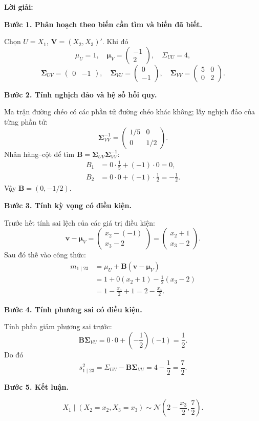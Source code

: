 \documentclass[11pt,a4paper]{article}
\renewcommand{\boldsymbol}[1]{\symbf{#1}}
\newenvironment{solution}{%
  \par\medskip\noindent\textbf{Lời giải:}\par\nopagebreak[4]\smallskip\noindent\ignorespaces
}{\par}
\newcommand{\answer}[1]{\boxed{#1}}
\newcommand{\step}[2]{\par\medskip\noindent\textbf{Bước #1. #2}\par\nopagebreak[4]\smallskip\noindent}
\begin{document}
\begin{solution}
\begin{enumerate}[label=\textbf{\alph*)}]
\step{1}{Phân hoạch theo biến cần tìm và biến đã biết.}
Chọn $U=X_1$, $\mathbf{V}=(X_2,X_3)'$. Khi đó
\[
\mu_U=1,\quad\boldsymbol{\mu}_V=\begin{pmatrix}-1\\2\end{pmatrix},\quad
\Sigma_{UU}=4,
\]
\[
\boldsymbol{\Sigma}_{UV}=\begin{pmatrix}0&-1\end{pmatrix},\quad
\boldsymbol{\Sigma}_{VU}=\begin{pmatrix}0\\-1\end{pmatrix},\quad
\boldsymbol{\Sigma}_{VV}=\begin{pmatrix}5&0\\0&2\end{pmatrix}.
\]
\step{2}{Tính nghịch đảo và hệ số hồi quy.}
Ma trận đường chéo có các phần tử đường chéo khác không; lấy nghịch đảo
của từng phần tử:
\[
\boldsymbol{\Sigma}_{VV}^{-1}=\begin{pmatrix}1/5&0\\0&1/2\end{pmatrix}.
\]
Nhân hàng--cột để tìm $\mathbf{B}=\boldsymbol{\Sigma}_{UV}\boldsymbol{\Sigma}_{VV}^{-1}$:
\begin{align*}
B_1&=0\cdot\frac15+(-1)\cdot0=0,\\
B_2&=0\cdot0+(-1)\cdot\frac12=-\frac12.
\end{align*}
Vậy $\mathbf{B}=(0,-1/2)$.
\step{3}{Tính kỳ vọng có điều kiện.}
Trước hết tính sai lệch của các giá trị điều kiện:
\[
\mathbf{v}-\boldsymbol{\mu}_V
=\begin{pmatrix}x_2-(-1)\\x_3-2\end{pmatrix}
=\begin{pmatrix}x_2+1\\x_3-2\end{pmatrix}.
\]
Sau đó thế vào công thức:
\begin{align*}
m_{1\mid23}&=\mu_U+\mathbf{B}(\mathbf{v}-\boldsymbol{\mu}_V)\\
&=1+0(x_2+1)-\frac12(x_3-2)\\
&=1-\frac{x_3}{2}+1=2-\frac{x_3}{2}.
\end{align*}
\step{4}{Tính phương sai có điều kiện.}
Tính phần giảm phương sai trước:
\[
\mathbf{B}\boldsymbol{\Sigma}_{VU}=0\cdot0+\left(-\frac12\right)(-1)=\frac12.
\]
Do đó
\[
s^2_{1\mid23}=\Sigma_{UU}-\mathbf{B}\boldsymbol{\Sigma}_{VU}
=4-\frac12=\frac72.
\]
\step{5}{Kết luận.}
\[
X_1\mid(X_2=x_2,X_3=x_3)
\sim\answer{\mathcal{N}\left(2-\frac{x_3}{2},\frac72\right)}.
\]
\end{enumerate}
\end{solution}
\end{document}
